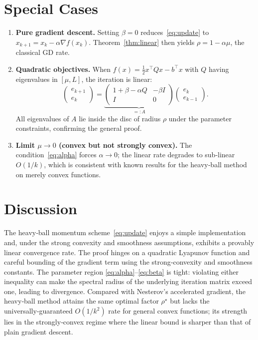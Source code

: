 \documentclass[12pt]{article}
\begin{document}
\section*{Special Cases}
\begin{enumerate}[label={\arabic*.}]
\item \textbf{Pure gradient descent.} Setting $\beta=0$ reduces~\eqref{eq:update}
to $x_{k+1}=x_k-\alpha\nabla f(x_k)$.  Theorem~\ref{thm:linear}
then yields $\rho=1-\alpha\mu$, the classical GD rate.
\item \textbf{Quadratic objectives.}  When $f(x)=\tfrac12 x^{\top}Qx-b^{\top}x$
with $Q$ having eigenvalues in $[\mu,L]$, the iteration is linear:
\[
\begin{pmatrix}e_{k+1}\\ e_k\end{pmatrix}
=
\underbrace{\begin{pmatrix}
1+\beta-\alpha Q & -\beta I\\[1mm]
I & 0
\end{pmatrix}}_{=:A}
\begin{pmatrix}e_{k}\\ e_{k-1}\end{pmatrix}.
\]
All eigenvalues of $A$ lie inside the disc of radius $\rho$ under the
parameter constraints, confirming the general proof.
\item \textbf{Limit $\mu\to0$ (convex but not strongly convex).}
The condition~\eqref{eq:alpha} forces $\alpha\to0$; the linear rate
degrades to sub‑linear $O(1/k)$, which is consistent with known results for
the heavy‑ball method on merely convex functions.
\end{enumerate}

\section*{Discussion}
The heavy‑ball momentum scheme~\eqref{eq:update} enjoys a simple
implementation and, under the strong convexity and smoothness assumptions,
exhibits a provably linear convergence rate.  The proof hinges on a
quadratic Lyapunov function and careful bounding of the gradient term using
the strong‑convexity and smoothness constants.  The parameter region
\eqref{eq:alpha}–\eqref{eq:beta} is tight: violating either inequality can make
the spectral radius of the underlying iteration matrix exceed one, leading to
divergence.  Compared with Nesterov’s accelerated gradient, the heavy‑ball
method attains the same optimal factor $\rho^{\star}$ but lacks the
universally‑guaranteed $O(1/k^{2})$ rate for general convex functions; its
strength lies in the strongly‑convex regime where the linear bound is
sharper than that of plain gradient descent.
\end{document}
